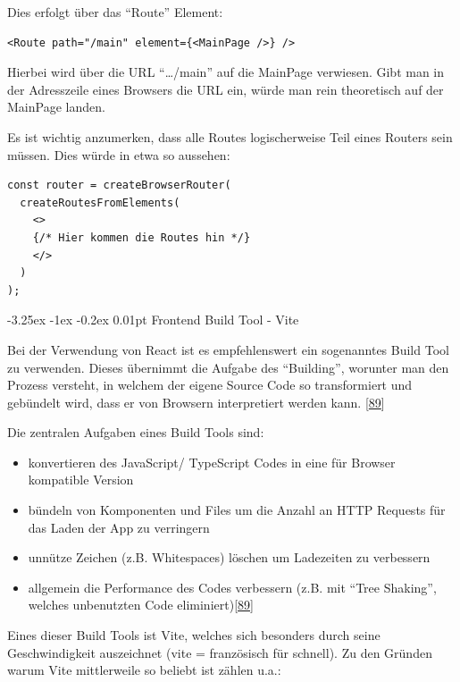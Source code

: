 \documentclass[
    headings=optiontotocandhead,%
    twoside,
    numbers=noenddot,%
    12pt, %
    titlepage, %
    parskip=full, %
    listof=leveldown, 
    numbers=noenddot, %
    a4paper,DIV=14,
    BCOR=15mm,
]{scrbook}
\makeatletter
\providecommand{\tightlist}{%
  \setlength{\itemsep}{0pt}\setlength{\parskip}{0pt}}
\renewcommand\paragraph{\@startsection{paragraph}{4}{\z@}%
    {-3.25ex \@plus -1ex \@minus -0.2ex}%
    {0.01pt}%
    {\raggedsection\normalfont\sectfont\nobreak\size@paragraph}%
  }
\makeatother
\begin{document}
Dies erfolgt über das ``Route'' Element:

\begin{lstlisting}[caption={Beispiel Route Element}]
<Route path="/main" element={<MainPage />} />
\end{lstlisting}

Hierbei wird über die URL ``\ldots/main'' auf die MainPage verwiesen.
Gibt man in der Adresszeile eines Browsers die URL ein, würde man rein
theoretisch auf der MainPage landen.

Es ist wichtig anzumerken, dass alle Routes logischerweise Teil eines
Routers sein müssen. Dies würde in etwa so aussehen:

\begin{lstlisting}[caption={Beispiel React Router}]
const router = createBrowserRouter(
  createRoutesFromElements(
    <>
    {/* Hier kommen die Routes hin */}
    </>
  )
);
\end{lstlisting}

\hypertarget{frontend-build-tool---vite}{%
\paragraph{Frontend Build Tool -
Vite}\label{frontend-build-tool---vite}}

Bei der Verwendung von React ist es empfehlenswert ein sogenanntes Build
Tool zu verwenden. Dieses übernimmt die Aufgabe des ``Building'',
worunter man den Prozess versteht, in welchem der eigene Source Code so
transformiert und gebündelt wird, dass er von Browsern interpretiert
werden kann. {[}\protect\hyperlink{ref-CodeParrot-BuildTools}{89}{]}

Die zentralen Aufgaben eines Build Tools sind:

\begin{itemize}
\tightlist
\item
  konvertieren des JavaScript/ TypeScript Codes in eine für Browser
  kompatible Version
\item
  bündeln von Komponenten und Files um die Anzahl an HTTP Requests für
  das Laden der App zu verringern
\item
  unnütze Zeichen (z.B. Whitespaces) löschen um Ladezeiten zu verbessern
\item
  allgemein die Performance des Codes verbessern (z.B. mit ``Tree
  Shaking'', welches unbenutzten Code
  eliminiert){[}\protect\hyperlink{ref-CodeParrot-BuildTools}{89}{]}
\end{itemize}

Eines dieser Build Tools ist Vite, welches sich besonders durch seine
Geschwindigkeit auszeichnet (vite = französisch für schnell). Zu den
Gründen warum Vite mittlerweile so beliebt ist zählen u.a.:
\end{document}
